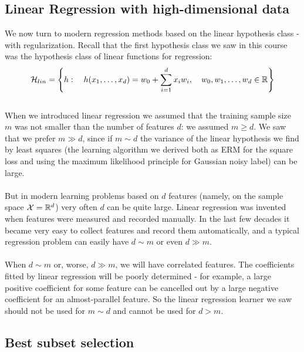     \subsection{Linear Regression with high-dimensional data}

    We now turn to modern regression methods based on the linear hypothesis
    class - with regularization. Recall that the first hypothesis class we saw
    in this course was the hypothesis class of linear functions for regression: 
     \[
 \mathcal{H}_{lin} = \left\{h: \quad h(x_1,\ldots,x_d)= w_0 + \sum_{i=1}^d x_i w_i,  \quad w_0,w_1,\ldots, w_d\in\mathbb{R}
 \right\}
    \]
~\\
    When we introduced linear regression we assumed that the training sample
    size $m$ was not smaller than the number of features $d$: we assumed $m\geq
    d$. We saw that we prefer $m\gg d$, since if $m\sim d$ the variance of the
    linear hypothesis we find by least squares (the learning algorithm we
      derived both as ERM for the square loss and using the maximum likelihood
    principle for Gaussian noisy label) can be large.
\\~\\
    But in modern learning problems based on $d$ features (namely, on the sample
    space $\mathcal{X}=\mathbb{R}^d$) very often $d$ can be quite large. Linear regression was
    invented when features were measured and recorded manually.  In the last few
    decades it became very easy to
    collect features and record them automatically, and a typical regression
    problem can easily have $d\sim m$ or even $d\gg m$. 
\\~\\
    When $d\sim m$ or, worse, $d\gg m$, we will have correlated features. The
    coefficients fitted by linear regression will be poorly determined - for
    example, a large positive coefficient for some feature can be cancelled out
    by a large negative coefficient for an almost-parallel feature. 
    So the linear regression learner we saw should not be used for $m\sim d$ and
    cannot be used for $d>m$.

    \subsection{Best subset selection}

